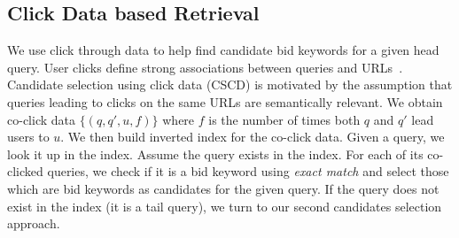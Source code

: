 \subsection{Click Data based Retrieval}
\label{sec:CSCD}
We use click through data to help find candidate bid keywords for a given
head query.  User clicks define strong associations between queries
and URLs~\cite{fuxman:keywordgeneration}.  Candidate selection using
click data (CSCD) is motivated by the assumption that queries leading
to clicks on the same URLs are semantically relevant.  We obtain
co-click data $\{(q,q',u,f)\}$ where $f$ is the number of times both
$q$ and $q'$ lead users to $u$.
We then build inverted index for the co-click data.  Given a query, we look it up in the index.  Assume the query exists in the index. For each of its co-clicked queries, we check if it is a bid
keyword using {\it exact match} and select those which are bid
keywords as candidates for the given query. If the query does not exist in the
index (it is a tail query), we turn to our second candidates selection
approach.
